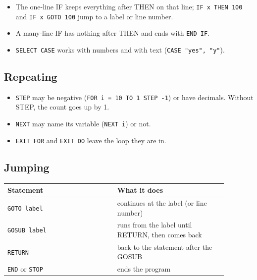 \begin{itemize}
\item The one-line IF keeps everything after THEN on that line; \texttt{IF x THEN 100} and \texttt{IF x GOTO 100} jump to a label or line number.
\item A many-line IF has nothing after THEN and ends with \texttt{END IF}.
\item \texttt{SELECT CASE} works with numbers and with text (\texttt{CASE "yes", "y"}).
\end{itemize}

\subsection{Repeating}


\begin{itemize}
\item \verb|STEP| may be negative (\texttt{FOR i = 10 TO 1 STEP -{}1}) or have decimals. Without STEP, the count goes up by 1.
\item \verb|NEXT| may name its variable (\texttt{NEXT i}) or not.
\item \texttt{EXIT FOR} and \texttt{EXIT DO} leave the loop they are in.
\end{itemize}

\subsection{Jumping}

\begin{center}
\small
\begin{tabular}{@{}>{\raggedright\arraybackslash}p{0.44\linewidth} >{\raggedright\arraybackslash}p{0.44\linewidth}@{}}
\toprule
\textbf{Statement} & \textbf{What it does} \\
\midrule
\texttt{GOTO label} & continues at the label (or line number) \\
\texttt{GOSUB label} & runs from the label until RETURN, then comes back \\
\verb|RETURN| & back to the statement after the GOSUB \\
\verb|END| or \verb|STOP| & ends the program \\
\bottomrule
\end{tabular}
\end{center}

